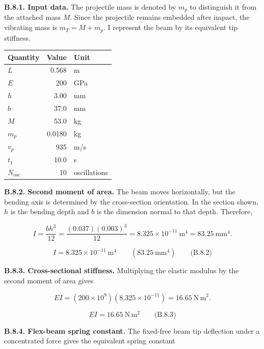 \begingroup
\setlength{\abovedisplayskip}{6pt}
\setlength{\belowdisplayskip}{6pt}
\setlength{\abovedisplayshortskip}{4pt}
\setlength{\belowdisplayshortskip}{4pt}
\setlength{\intextsep}{6pt}

\textbf{B.8.1. Input data.} The projectile mass is denoted by $m_p$ to distinguish it from the attached mass $M$. Since the projectile remains embedded after impact, the vibrating mass is $m_T=M+m_p$. I represent the beam by its equivalent tip stiffness.

{ %
\begin{center}\small\begin{tabular}{@{}lrl@{}}
\toprule\noalign{}
Quantity & Value & Unit \\
\midrule\noalign{}
$L$ & 0.568 & m \\
$E$ & 200 & GPa \\
$h$ & 3.00 & mm \\
$b$ & 37.0 & mm \\
$M$ & 53.0 & kg \\
$m_p$ & 0.0180 & kg \\
$v_p$ & 935 & m/s \\
$t_1$ & 10.0 & s \\
$N_{\mathrm{osc}}$ & 10 & oscillations \\
\bottomrule\end{tabular}\end{center}
}

\textbf{B.8.2. Second moment of area.} The beam moves horizontally, but the bending axis is determined by the cross-section orientation. In the section shown, $h$ is the bending depth and $b$ is the dimension normal to that depth. Therefore,

\[
I=\frac{bh^3}{12}
 =\frac{(0.037)(0.003)^3}{12}
 =8.325\times10^{-11}\ \mathrm{m^4}
 =83.25\ \mathrm{mm^4}.
\]

\[
\boxed{I=8.325\times10^{-11}\ \mathrm{m^4}
\qquad\left(83.25\ \mathrm{mm^4}\right)}
\qquad\text{(B.8.2)}
\]

\textbf{B.8.3. Cross-sectional stiffness.} Multiplying the elastic modulus by the second moment of area gives

\[
EI=(200\times10^9)(8.325\times10^{-11})
 =16.65\ \mathrm{N\,m^2}.
\]

\[
\boxed{EI=16.65\ \mathrm{N\,m^2}}
\qquad\text{(B.8.3)}
\]

\textbf{B.8.4. Flex-beam spring constant.} The fixed-free beam tip deflection under a concentrated force gives the equivalent spring constant

